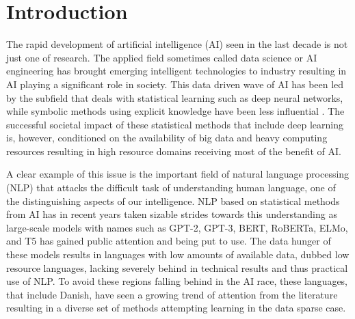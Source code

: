 \documentclass[main.tex]{subfiles}
\begin{document}
\chapter{Introduction}
The rapid development of artificial intelligence (AI) seen in the last decade is not just one of research.
The applied field sometimes called data science or AI engineering has brought emerging intelligent technologies to industry resulting in AI playing a significant role in society.
This data driven wave of AI has been led by the subfield that deals with statistical learning such as deep neural networks, while symbolic methods using explicit knowledge have been less influential \cite[p. 1]{lecun2015deep}.
The successful societal impact of these statistical methods that include deep learning is, however, conditioned on the availability of big data and heavy computing resources resulting in high resource domains receiving most of the benefit of AI.

A clear example of this issue is the important field of natural language processing (NLP) that attacks the difficult task of understanding human language, one of the distinguishing aspects of our intelligence.
NLP based on statistical methods from AI has in recent years taken sizable strides towards this understanding as large-scale models with names such as GPT-2, GPT-3, BERT, RoBERTa, ELMo, and T5 has gained public attention and being put to use.
The data hunger of these models results in languages with low amounts of available data, dubbed low resource languages, lacking severely behind in technical results and thus practical use of NLP.
To avoid these regions falling behind in the AI race, these languages, that include Danish, have seen a growing trend of attention from the literature resulting in a diverse set of methods attempting learning in the data sparse case. \cite{hedderich2021survey}
\end{document}
